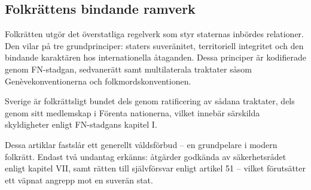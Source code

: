 %
%


\subsection{Folkrättens bindande ramverk}

Folkrätten utgör det överstatliga regelverk som styr staternas inbördes relationer. 
Den vilar på tre grundprinciper: staters suveränitet, territoriell integritet och den 
bindande karaktären hos internationella åtaganden. Dessa principer är kodifierade genom FN-stadgan, 
sedvanerätt samt multilaterala traktater såsom Genèvekonventionerna och folkmordskonventionen.

Sverige är folkrättsligt bundet dels genom ratificering av sådana traktater, dels genom sitt 
medlemskap i Förenta nationerna, vilket innebär särskilda skyldigheter enligt FN-stadgans kapitel I.



Dessa artiklar fastslår ett generellt våldsförbud – en grundpelare i modern folkrätt. Endast två undantag erkänns: åtgärder godkända av säkerhetsrådet enligt kapitel VII, samt rätten till självförsvar enligt artikel 51 – vilket förutsätter ett väpnat angrepp mot en suverän stat.


